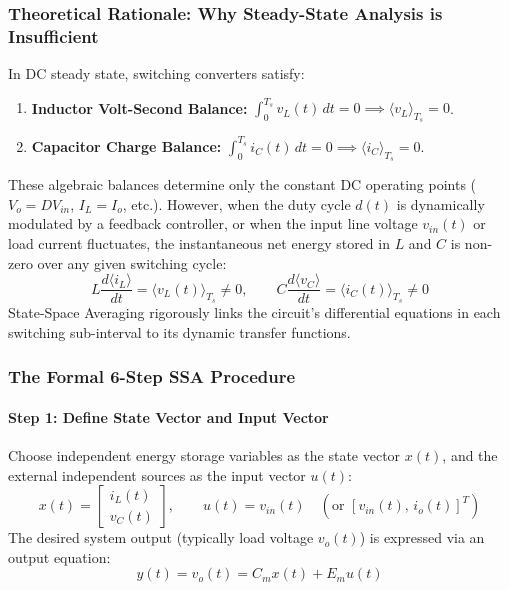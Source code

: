 \subsubsection{Theoretical Rationale: Why Steady-State Analysis is Insufficient}
In DC steady state, switching converters satisfy:
\begin{enumerate}
  \item \textbf{Inductor Volt-Second Balance:} $\int_0^{T_s} v_L(t)\,dt = 0 \implies \langle v_L \rangle_{T_s} = 0$.
  \item \textbf{Capacitor Charge Balance:} $\int_0^{T_s} i_C(t)\,dt = 0 \implies \langle i_C \rangle_{T_s} = 0$.
\end{enumerate}
These algebraic balances determine only the constant DC operating points ($V_o = D V_{in}$, $I_L = I_o$, etc.). However, when the duty cycle $d(t)$ is dynamically modulated by a feedback controller, or when the input line voltage $v_{in}(t)$ or load current fluctuates, the instantaneous net energy stored in $L$ and $C$ is non-zero over any given switching cycle:
\begin{equation}
L \frac{d\langle i_L \rangle}{dt} = \langle v_L(t) \rangle_{T_s} \ne 0, \qquad C \frac{d\langle v_C \rangle}{dt} = \langle i_C(t) \rangle_{T_s} \ne 0
\end{equation}
State-Space Averaging rigorously links the circuit's differential equations in each switching sub-interval to its dynamic transfer functions.

\subsubsection{The Formal 6-Step SSA Procedure}

\paragraph{Step 1: Define State Vector and Input Vector}
Choose independent energy storage variables as the state vector $x(t)$, and the external independent sources as the input vector $u(t)$:
\begin{equation}
x(t) = \begin{bmatrix} i_L(t) \\ v_C(t) \end{bmatrix}, \qquad u(t) = v_{in}(t) \quad (\text{or } [v_{in}(t),\, i_o(t)]^T)
\end{equation}
The desired system output (typically load voltage $v_o(t)$) is expressed via an output equation:
\begin{equation}
y(t) = v_o(t) = C_m x(t) + E_m u(t)
\end{equation}

